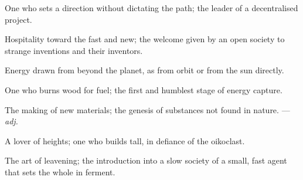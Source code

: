  One who sets a direction without dictating the path; the leader of a decentralised project.

 Hospitality toward the fast and new; the welcome given by an open society to strange inventions and their inventors.

 Energy drawn from beyond the planet, as from orbit or from the sun directly.

  One who burns wood for fuel; the first and humblest stage of energy capture.

 The making of new materials; the genesis of substances not found in nature. ---  \textit{adj.}

 A lover of heights; one who builds tall, in defiance of the oikoclast.

 The art of leavening; the introduction into a slow society of a small, fast agent that sets the whole in ferment.
